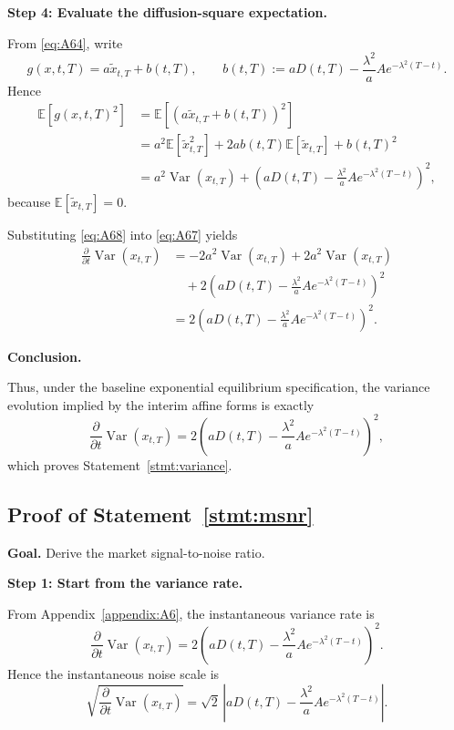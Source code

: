 \documentclass[12pt]{article}
\theoremstyle{statementstyle}
\begin{document}
\begin{appendices}
\medskip
\noindent\textbf{Step 4: Evaluate the diffusion-square expectation.}

From \eqref{eq:A64}, write
\[
g(x,t,T)
=
a\widetilde{x}_{t,T}
+
b(t,T),
\qquad
b(t,T):=
aD(t,T)-\frac{\lambda^{2}}{a}A e^{-\lambda^{2}(T-t)}.
\]
Hence
\begin{align}
\mathbb{E}[g(x,t,T)^{2}]
&=
\mathbb{E}\!\left[\left(a\widetilde{x}_{t,T}+b(t,T)\right)^{2}\right]
\nonumber\\
&=
a^{2}\mathbb{E}[\widetilde{x}_{t,T}^{2}]
+
2ab(t,T)\mathbb{E}[\widetilde{x}_{t,T}]
+
b(t,T)^{2}
\nonumber\\
&=
a^{2}\operatorname{Var}(x_{t,T})
+
\left(
aD(t,T)-\frac{\lambda^{2}}{a}A e^{-\lambda^{2}(T-t)}
\right)^{2},
\tag{A.6.8}\label{eq:A68}
\end{align}
because \(\mathbb{E}[\widetilde{x}_{t,T}]=0\).

Substituting \eqref{eq:A68} into \eqref{eq:A67} yields
\begin{align}
\frac{\partial}{\partial t}\operatorname{Var}(x_{t,T})
&=
-2a^{2}\operatorname{Var}(x_{t,T})
+
2a^{2}\operatorname{Var}(x_{t,T})
\nonumber\\
&\quad
+
2\left(
aD(t,T)-\frac{\lambda^{2}}{a}A e^{-\lambda^{2}(T-t)}
\right)^{2}
\nonumber\\
&=
2\left(
aD(t,T)-\frac{\lambda^{2}}{a}A e^{-\lambda^{2}(T-t)}
\right)^{2}.
\tag{A.6.9}\label{eq:A69}
\end{align}

\medskip
\noindent\textbf{Conclusion.}

Thus, under the baseline exponential equilibrium specification, the
variance evolution implied by the interim affine forms is exactly
\[
\frac{\partial}{\partial t}\operatorname{Var}(x_{t,T})
=
2\left(
aD(t,T)-\frac{\lambda^{2}}{a}A e^{-\lambda^{2}(T-t)}
\right)^{2},
\]
which proves Statement~\ref{stmt:variance}.

\subsection{Proof of Statement~\ref{stmt:msnr}}
\label{appendix:A7}

\textbf{Goal.}
Derive the market signal-to-noise ratio.

\medskip
\noindent\textbf{Step 1: Start from the variance rate.}

From Appendix~\ref{appendix:A6}, the instantaneous variance rate is
\begin{equation}
\frac{\partial}{\partial t}\operatorname{Var}(x_{t,T})
=
2\left(
aD(t,T)-\frac{\lambda^{2}}{a}A e^{-\lambda^{2}(T-t)}
\right)^{2}.
\tag{A.7.1}\label{eq:A71}
\end{equation}
Hence the instantaneous noise scale is
\begin{equation}
\sqrt{\frac{\partial}{\partial t}\operatorname{Var}(x_{t,T})}
=
\sqrt{2}\,
\left|
aD(t,T)-\frac{\lambda^{2}}{a}A e^{-\lambda^{2}(T-t)}
\right|.
\tag{A.7.2}\label{eq:A72}
\end{equation}


\end{appendices}
\end{document}
